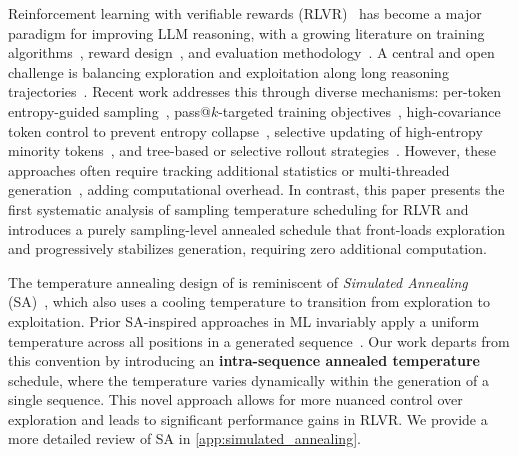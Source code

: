 Reinforcement learning with verifiable rewards (RLVR)~\citep{shao2024deepseekmath,guo2025deepseek,lambert2024tulu,yu2025dapo,yang2025qwen3,hu2025open,guan2025rstar,zeng2025simplerl} has become a major paradigm for improving LLM reasoning, with a growing literature on training algorithms~\citep{yu2025dapo,liu2025understanding,yue2025vapo,zheng2025group}, reward design~\citep{zuo2025ttrl,zhao2025learning,agarwal2025unreasonable,prabhudesai2025maximizing}, and evaluation methodology~\citep{yue2025does,zhao2025echo,hochlehnert2025sober}. A central and open challenge is balancing exploration and exploitation along long reasoning trajectories~\citep{cheng2025reasoning,cui2025entropy,wang2025beyond,deng2025trial}. Recent work addresses this through diverse mechanisms: per-token entropy-guided sampling~\citep{cheng2025reasoning}, pass@$k$-targeted training objectives~\citep{tangoptimizing, chen2025pass}, high-covariance token control to prevent entropy collapse~\citep{cui2025entropy}, selective updating of high-entropy minority tokens~\citep{wang2025beyond}, and tree-based or selective rollout strategies~\citep{li2025treepo,xu2025not,zheng2025act,dou2025improving}. However, these approaches often require tracking additional statistics or multi-threaded generation~\citep{pan2025learning}, adding computational overhead. In contrast, this paper presents the first systematic analysis of sampling temperature scheduling for RLVR and introduces a purely sampling-level annealed schedule that front-loads exploration and progressively stabilizes generation, requiring zero additional computation.


The temperature annealing design of \alg is reminiscent of \emph{Simulated Annealing} (SA)~\citep{kirkpatrick1983optimization, bertsimas1993simulated}, which also uses a cooling temperature to transition from exploration to exploitation. Prior SA-inspired approaches in ML invariably apply a uniform temperature across all positions in a generated sequence~\citep{liu2021simulated, zhang2024edt, israel2025enabling, manvi2024adaptive}. 
Our work departs from this convention by introducing an \textbf{intra-sequence annealed temperature} schedule, where the temperature varies dynamically within the generation of a single sequence. This novel approach allows for more nuanced control over exploration and leads to significant performance gains in RLVR. We provide a more detailed review of SA in 
\cref{app:simulated_annealing}.